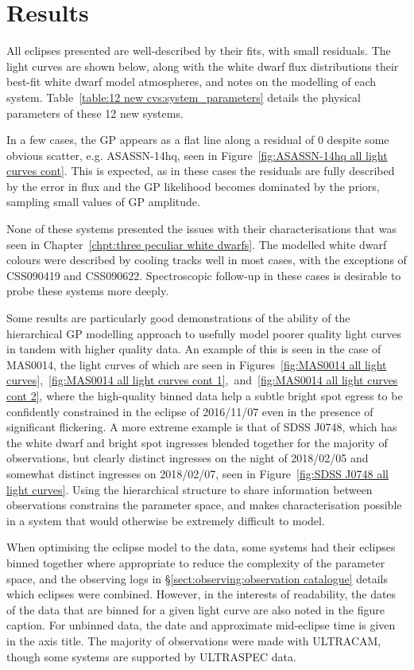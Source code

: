 \section{Results}
\label{sect:results:12 new CVs:results}

All eclipses presented are well-described by their fits, with small residuals. The light curves are shown below, along with the white dwarf flux distributions their best-fit white dwarf model atmospheres, and notes on the modelling of each system.
Table~\ref{table:12 new cvs:system_parameters} details the physical parameters of these 12 new systems.

In a few cases, the GP appears as a flat line along a residual of 0 despite some obvious scatter, e.g. ASASSN-14hq, seen in Figure~\ref{fig:ASASSN-14hq all light curves cont}. This is expected, as in these cases the residuals are fully described by the error in flux and the GP likelihood becomes dominated by the priors, sampling small values of GP amplitude.

None of these systems presented the issues with their characterisations that was seen in Chapter~\ref{chpt:three peculiar white dwarfs}. The modelled white dwarf colours were described by cooling tracks well in most cases, with the exceptions of CSS090419 and CSS090622. Spectroscopic follow-up in these cases is desirable to probe these systems more deeply.

Some results are particularly good demonstrations of the ability of the hierarchical GP modelling approach to usefully model poorer quality light curves in tandem with higher quality data.
An example of this is seen in the case of MAS0014, the light curves of which are seen in Figures~\ref{fig:MAS0014 all light curves},~\ref{fig:MAS0014 all light curves cont 1},~and~\ref{fig:MAS0014 all light curves cont 2}, where the high-quality binned data help a subtle bright spot egress to be confidently constrained in the eclipse of 2016/11/07 even in the presence of significant flickering.
A more extreme example is that of SDSS J0748, which has the white dwarf and bright spot ingresses blended together for the majority of observations, but clearly distinct ingresses on the night of 2018/02/05 and somewhat distinct ingresses on 2018/02/07, seen in Figure~\ref{fig:SDSS J0748 all light curves}.
Using the hierarchical structure to share information between observations constrains the parameter space, and makes characterisation possible in a system that would otherwise be extremely difficult to model.

When optimising the eclipse model to the data, some systems had their eclipses binned together where appropriate to reduce the complexity of the parameter space, and the observing logs in \S\ref{sect:observing:observation catalogue} details which eclipses were combined. However, in the interests of readability, the dates of the data that are binned for a given light curve are also noted in the figure caption. For unbinned data, the date and approximate mid-eclipse time is given in the axis title.
The majority of observations were made with ULTRACAM, though some systems are supported by ULTRASPEC data.



